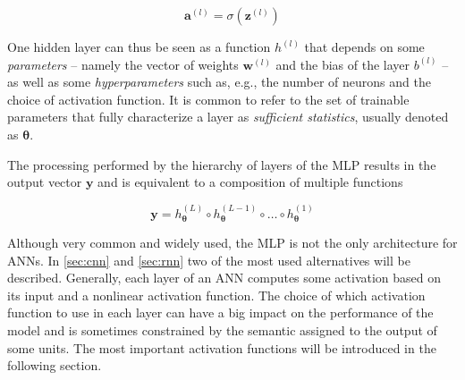 \begin{equation}\label{eq:MLP_activation}
    \mathbf{a}^{(l)} = \sigma(\mathbf{z}^{(l)})
\end{equation}

One hidden layer can thus be seen as a function $h^{(l)}$ that depends on some
\emph{parameters} -- namely the vector of weights $\mathbf{w}^{(l)}$ and the
bias of the layer $b^{(l)}$ -- as well as some \emph{hyperparameters} such as,
e.g., the number of neurons and the choice of activation function. It is common
to refer to the set of trainable parameters that fully characterize a layer as
\emph{sufficient statistics}, usually denoted as $\boldsymbol{\theta}$.

The processing performed by the hierarchy of layers of the MLP results in the
output vector $\mathbf{y}$ and is equivalent to a composition of multiple
functions

\begin{equation}\label{eq:fn_composition}
    \textbf{y} = h^{(L)}_{\boldsymbol{\theta}} \circ
        h^{(L-1)}_{\boldsymbol{\theta}} \circ
        \dots \circ h^{(1)}_{\boldsymbol{\theta}}
\end{equation}

Although very common and widely used, the MLP is not the only architecture for
ANNs. In \autoref{sec:cnn} and \autoref{sec:rnn} two of the most used
alternatives will be described. Generally, each layer of an ANN computes some
activation based on its input and a nonlinear activation function. The choice
of which activation function to use in each layer can have a big impact on the
performance of the model and is sometimes constrained by the semantic assigned
to the output of some units. The most important activation functions will be
introduced in the following section.

